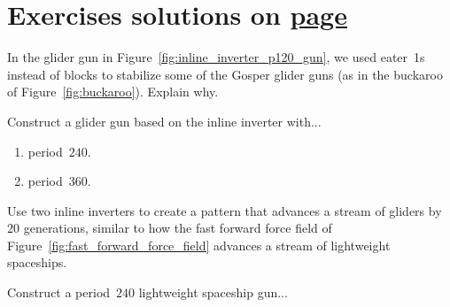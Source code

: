 \section*{Exercises \hfill \normalfont\textsf{\small solutions on \hyperlink{solutions_periodic_circuitry}{page \pageref{solutions_periodic_circuitry}}}}
\label{sec:periodic_exercises}
\vspace*{-0.4cm}\hrulefill\vspace*{-0.3cm}\footnotesize\begin{multicols}{2}\vspace*{-0.4cm}\raggedcolumns{}
	\setlength{\parskip}{0pt}
	
	
	\begin{problem}\label{exer:inline_inverter_gun_why_buckaroo}
		In the glider gun in Figure~\ref{fig:inline_inverter_p120_gun}, we used eater~1s instead of blocks to stabilize some of the Gosper glider guns (as in the buckaroo of Figure~\ref{fig:buckaroo}). Explain why.
	\end{problem}
	
	
	\mfilbreak
	
	
	\begin{problem}\label{exer:inline_inverter_gun_high_period}
		Construct a glider gun based on the inline inverter with...\smallskip
		
		\begin{enumerate}[label=\bf\color{ocre}(\alph*)]
			\item period~$240$.
			
			\item period~$360$.
		\end{enumerate}
	\end{problem}
	
	
	\mfilbreak
	
	
	\begin{problem}\label{exer:inline_inverter_advancer}
		Use two inline inverters to create a pattern that advances a stream of gliders by $20$ generations, similar to how the fast forward force field of Figure~\ref{fig:fast_forward_force_field} advances a stream of lightweight spaceships.
	\end{problem}
	
	
	\mfilbreak
	
	
	\begin{problem}\label{exer:inline_inverter_lwss_gun}
		Construct a period~$240$ lightweight spaceship gun...\smallskip
		

\end{problem}
\end{multicols}
